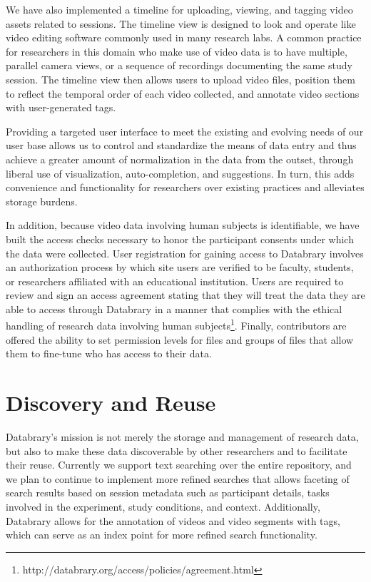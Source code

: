 \documentclass{sig-alternate-2013}
\begin{document}
We have also implemented a timeline for uploading, viewing, and tagging video assets related to sessions.
The timeline view is designed to look and operate like video editing software commonly used in many research labs.
A common practice for researchers in this domain who make use of video data is to have multiple, parallel camera views, or a sequence of recordings documenting the same study session.
The timeline view then allows users to upload video files, position them to reflect the temporal order of each video collected, and annotate video sections with user-generated tags. 

Providing a targeted user interface to meet the existing and evolving needs of our user base allows us to control and standardize the means of data entry and thus achieve a greater amount of normalization in the data from the outset, through liberal use of visualization, auto-completion, and suggestions.
In turn, this adds convenience and functionality for researchers over existing practices and alleviates storage burdens.

In addition, because video data involving human subjects is identifiable, we have built the access checks necessary to honor the participant consents under which the data were collected. 
User registration for gaining access to Databrary involves an authorization process by which site users are verified to be faculty, students, or researchers affiliated with an educational institution.
Users are required to review and sign an access agreement stating that they will treat the data they are able to access through Databrary in a manner that complies with the ethical handling of research data involving human subjects\footnote{http://databrary.org/access/policies/agreement.html}.
Finally, contributors are offered the ability to set permission levels for files and groups of files that allow them to fine-tune who has access to their data. 

\section{Discovery and Reuse}

Databrary's mission is not merely the storage and management of research data, but also to make these data discoverable by other researchers and to facilitate their reuse.
Currently we support text searching over the entire repository, and we plan to continue to implement more refined searches that allows faceting of search results based on session metadata such as participant details, tasks involved in the experiment, study conditions, and context.
Additionally, Databrary allows for the annotation of videos and video segments with tags, which can serve as an index point for more refined search functionality.  
\end{document}
